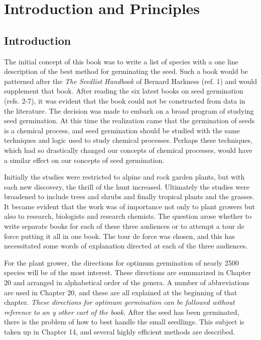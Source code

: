 \chapter{Introduction and Principles}

\section{Introduction}

The initial concept of this book was to write a list of species with a one line
description of the best method for germinating the seed. Such a book would be
patterned after the \textit{The Seedlist Handbook} of Bernard Harkness (ref. 1) and
would supplement that book. After reading the six latest books on seed
germination (refs. 2-7), it was evident that the book could not be constructed
from data in the literature. The decision was made to embark on a broad program
of studying seed germination. At this time the realization came that the
germination of seeds is a chemical process, and seed germination should be
studied with the same techniques and logic used to study chemical processes.
Perhaps these techniques, which had so drastically changed our concepts of
chemical processes, would have a similar effect on our concepts of seed
germination.

Initially the studies were restricted to alpine and rock garden plants, but with
each new discovery, the thrill of the hunt increased. Ultimately the studies were
broadened to include trees and shrubs and finally tropical plants and the grasses. It
became evident that the work was of importance not only to plant growers but also to
research, biologists and research chemists. The question arose whether to write
separate books for each of these three audiences or to attempt a tour de force putting
it all in one book. The tour de force was chosen, and this has necessitated some
words of explanation directed at each of the three audiences.

For the plant grower, the directions for optimum germination of nearly 2500
species will be of the most interest. These directions are summarized in Chapter 20
and arranged in alphabetical order of the genera. A number of abbreviations are used
in Chapter 20, and these are all explained at the beginning of that chapter. \textit{These
directions for optimum germination can be followed without reference to an y other cart
of the book.} After the seed has been germinated, there is the problem of how to best
handle the small seedlings. This subject is taken up in Chapter 14, and several highly
efficient methods are described.

